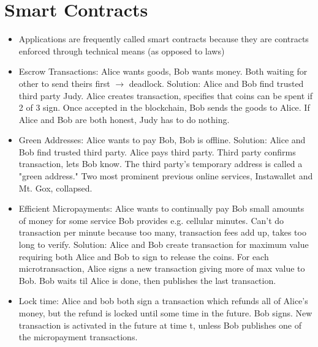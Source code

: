 \documentclass{article}
\begin{document}
\section*{Smart Contracts}
\begin{itemize}
\item Applications are frequently called smart contracts because they are contracts enforced through technical means (as opposed to laws)

\item Escrow Transactions: Alice wants goods, Bob wants money. Both waiting for other to send theirs first $\rightarrow$ deadlock. Solution: Alice and Bob find trusted third party Judy. Alice creates transaction, specifies that coins can be spent if 2 of 3 sign. Once accepted in the blockchain, Bob sends the goods to Alice. If Alice and Bob are both honest, Judy has to do nothing.

\item Green Addresses: Alice wants to pay Bob, Bob is offline. Solution: Alice and Bob find trusted third party. Alice pays third party. Third party confirms transaction, lets Bob know. The third party's temporary address is called a "green address." Two most prominent previous online services, Instawallet and Mt. Gox, collapsed.

\item Efficient Micropayments: Alice wants to continually pay Bob small amounts of money for some service Bob provides e.g. cellular minutes. Can't do transaction per minute because too many, transaction fees add up, takes too long to verify. Solution: Alice and Bob create transaction for maximum value requiring both Alice and Bob to sign to release the coins. For each microtransaction, Alice signs a new transaction giving more of max value to Bob. Bob waits til Alice is done, then publishes the last transaction.

\item Lock time: Alice and bob both sign a transaction which refunds all of Alice's money, but the refund is locked until some time in the future. Bob signs. New transaction is activated in the future at time t, unless Bob publishes one of the micropayment transactions.
\end{itemize}
\end{document}
